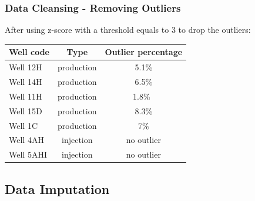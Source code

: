\documentclass[xcolor=table]{beamer}
\begin{document}
\begin{frame}
\frametitle{Data Cleansing - Removing Outliers}
\begin{block}{}
After using z-score with a threshold equals to 3 to drop the outliers:
\end{block}
\begin{table}
\begin{center}
\begin{tabular}{lcc}
\toprule
\textbf{Well code}&\textbf{Type}&\textbf{Outlier percentage}\tabularnewline
\midrule
Well 12H& production & 5.1\%\tabularnewline
Well 14H&production& 6.5\% \tabularnewline
Well 11H& production& 1.8\%\ \tabularnewline
Well 15D& production& 8.3\% \tabularnewline
Well 1C&  production & 7\%  \tabularnewline
Well 4AH & injection & no outlier\tabularnewline
Well 5AHI & injection & no outlier \tabularnewline
\bottomrule
\end{tabular}\end{center}
\end{table}

\end{frame}

\subsection{Data Imputation} 
\end{document}
